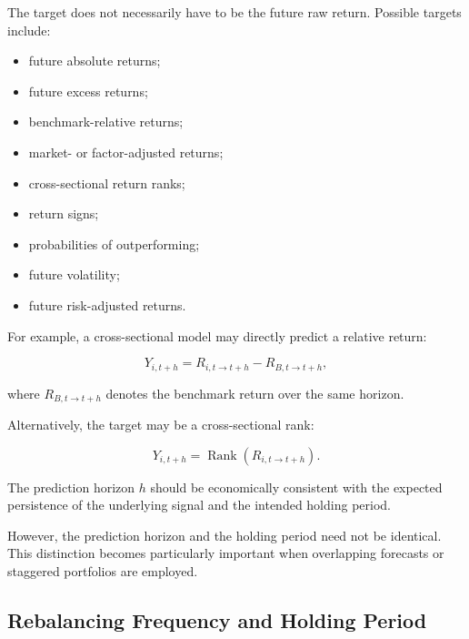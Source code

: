 \documentclass[11pt,a4paper]{article}
\begin{document}
The target does not necessarily have to be the future raw return. Possible
targets include:

\begin{itemize}
    \item future absolute returns;

    \item future excess returns;

    \item benchmark-relative returns;

    \item market- or factor-adjusted returns;

    \item cross-sectional return ranks;

    \item return signs;

    \item probabilities of outperforming;

    \item future volatility;

    \item future risk-adjusted returns.
\end{itemize}

For example, a cross-sectional model may directly predict a relative return:

\begin{equation}
Y_{i,t+h}
=
R_{i,t\rightarrow t+h}
-
R_{B,t\rightarrow t+h},
\end{equation}

where $R_{B,t\rightarrow t+h}$ denotes the benchmark return over the same
horizon.

Alternatively, the target may be a cross-sectional rank:

\begin{equation}
Y_{i,t+h}
=
\operatorname{Rank}
\left(
R_{i,t\rightarrow t+h}
\right).
\end{equation}

The prediction horizon $h$ should be economically consistent with the expected
persistence of the underlying signal and the intended holding period.

However, the prediction horizon and the holding period need not be identical.
This distinction becomes particularly important when overlapping forecasts or
staggered portfolios are employed.


\subsection{Rebalancing Frequency and Holding Period}
\label{subsec:rebalancing}
\end{document}
